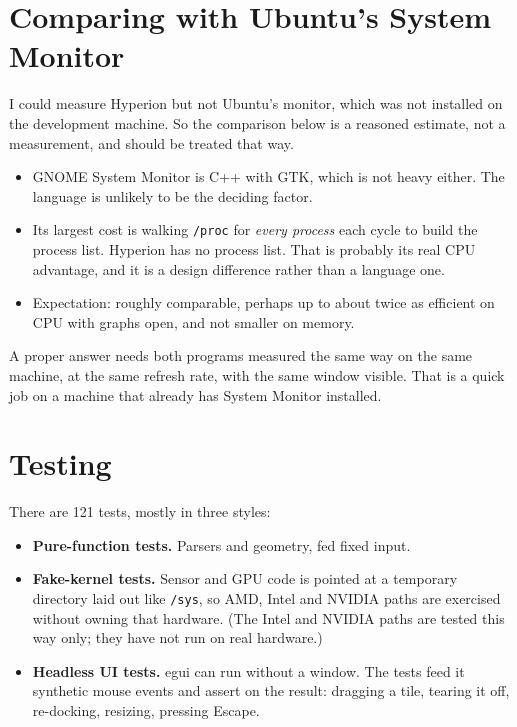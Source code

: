 \documentclass[11pt,a4paper]{article}
\newcommand{\file}[1]{\texttt{#1}}
\begin{document}
\section{Comparing with Ubuntu's System Monitor}
\label{sec:compare}

I could measure Hyperion but not Ubuntu's monitor, which was not installed on the development
machine. So the comparison below is a reasoned estimate, not a measurement, and should be
treated that way.

\begin{itemize}
  \item GNOME System Monitor is C++ with GTK, which is not heavy either. The language is
        unlikely to be the deciding factor.
  \item Its largest cost is walking \file{/proc} for \emph{every process} each cycle to build
        the process list. Hyperion has no process list. That is probably its real CPU
        advantage, and it is a design difference rather than a language one.
  \item Expectation: roughly comparable, perhaps up to about twice as efficient on CPU with
        graphs open, and not smaller on memory.
\end{itemize}

A proper answer needs both programs measured the same way on the same machine, at the same
refresh rate, with the same window visible. That is a quick job on a machine that already has
System Monitor installed.

\section{Testing}
\label{sec:testing}

There are 121 tests, mostly in three styles:

\begin{itemize}
  \item \textbf{Pure-function tests.} Parsers and geometry, fed fixed input.
  \item \textbf{Fake-kernel tests.} Sensor and GPU code is pointed at a temporary directory
        laid out like \file{/sys}, so AMD, Intel and NVIDIA paths are exercised without owning
        that hardware. (The Intel and NVIDIA paths are tested this way only; they have not
        run on real hardware.)
  \item \textbf{Headless UI tests.} egui can run without a window. The tests feed it synthetic
        mouse events and assert on the result: dragging a tile, tearing it off, re-docking,
        resizing, pressing Escape.
\end{itemize}
\end{document}
